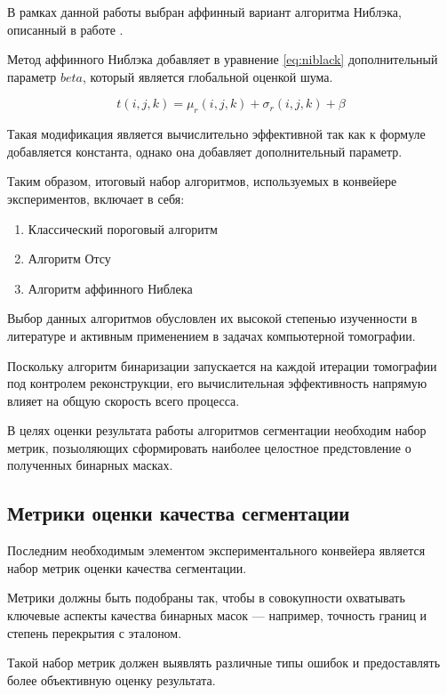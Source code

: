 В рамках данной работы выбран аффинный вариант алгоритма Ниблэка, описанный в работе \cite{николаев2013критерии}.

Метод аффинного Ниблэка добавляет в уравнение \ref{eq:niblack} дополнительный параметр \(beta\), который является глобальной оценкой шума.

\begin{equation}\label{eq:niblack_affine}
    t(i, j, k) = \mu_r(i, j, k) + \sigma_r(i, j, k) + \beta
\end{equation}

Такая модификация является вычислительно эффективной так как к формуле добавляется константа, однако она добавляет дополнительный параметр. 

Таким образом, итоговый набор алгоритмов, используемых в конвейере экспериментов, включает в себя:

\begin{enumerate}
    \item Классический пороговый алгоритм
    \item Алгоритм Отсу
    \item Алгоритм аффинного Ниблека
\end{enumerate}

Выбор данных алгоритмов обусловлен их высокой степенью изученности в литературе и активным применением в задачах компьютерной томографии.

Поскольку алгоритм бинаризации запускается на каждой итерации томографии под контролем реконструкции, его вычислительная эффективность напрямую влияет на общую скорость всего процесса.

В целях оценки результата работы алгоритмов сегментации необходим набор метрик, позыоляющих сформировать наиболее целостное предстовление о полученных бинарных масках.

\subsection{Метрики оценки качества сегментации}

Последним необходимым элементом экспериментального конвейера является набор метрик оценки качества сегментации.

Метрики должны быть подобраны так, чтобы в совокупности охватывать ключевые аспекты качества бинарных масок — например, точность границ и степень перекрытия с эталоном. 

Такой набор метрик должен выявлять различные типы ошибок и предоставлять более объективную оценку результата.

